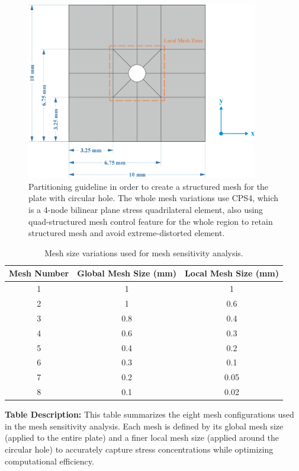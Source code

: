 \documentclass[12pt]{article}
\begin{document}
\begin{figure}[H]
    \centering
    \includegraphics[width=0.9\textwidth]{images/MESH_Base.png}
    \caption{Partitioning guideline in order to create a structured mesh for the plate with
    circular hole. The whole mesh variations use CPS4, which is a 4-node bilinear plane stress quadrilateral element, 
    also using quad-structured mesh control feature for the whole region to retain structured mesh
    and avoid extreme-distorted element.}
\label{fig:MeshPartitioning}
\end{figure}

\begin{table}[H]
    \centering
    \caption{Mesh size variations used for mesh sensitivity analysis.}
    \label{tab:mesh-sizes}
    \begin{tabular}{ccc}
        \toprule
        Mesh Number & Global Mesh Size (mm) & Local Mesh Size (mm) \\
        \midrule
        1 & 1 & 1 \\
        2 & 1 & 0.6 \\
        3 & 0.8 & 0.4 \\
        4 & 0.6 & 0.3 \\
        5 & 0.4 & 0.2 \\
        6 & 0.3 & 0.1 \\
        7 & 0.2 & 0.05 \\
        8 & 0.1 & 0.02 \\
        \bottomrule
    \end{tabular}
\end{table}

\noindent
\textbf{Table Description:} This table summarizes the eight mesh configurations used in the mesh sensitivity analysis. Each mesh is defined by its global mesh size (applied to the entire plate) and a finer local mesh size (applied around the circular hole) to accurately capture stress concentrations while optimizing computational efficiency.
\end{document}
